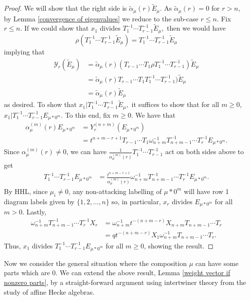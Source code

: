 \documentclass[ALCO,Unicode]{cedram}
\newcommand{\y}{{ \mathscr{Y} }}
\begin{document}
\begin{proof}
We will show that the right side is $\widetilde{\alpha}_{\mu}(r)\widetilde{E}_{\mu}$.
As $\widetilde{\alpha}_{\mu}(r) = 0$ for $r > n$, by Lemma \ref{convergence of eigenvalues} we reduce to the sub-case $r \leq n$. Fix $r \leq n$. 
If we could show that $x_1$ divides $ T_1^{-1}\cdots T_{r-1}^{-1}\widetilde{E}_{\mu},$ then we would have $$\rho(T_1^{-1}\cdots T_{r-1}^{-1}\widetilde{E}_{\mu}) = T_1^{-1}\cdots T_{r-1}^{-1}\widetilde{E}_{\mu} $$
implying that 
\begin{align*}
\y_r(\widetilde{E}_{\mu}) &= \widetilde{\alpha}_{\mu}(r) (T_{r-1}\cdots T_1 \rho T_1^{-1}\cdots T_{r-1}^{-1}) \widetilde{E}_{\mu} \\
&= \widetilde{\alpha}_{\mu}(r) T_{r-1}\cdots T_1 T_1^{-1}\cdots T_{r-1}^{-1}) \widetilde{E}_{\mu} \\
&= \widetilde{\alpha}_{\mu}(r)\widetilde{E}_{\mu}
\end{align*}
as desired.
To show that $x_1 | T_1^{-1}\cdots T_{r-1}^{-1}\widetilde{E}_{\mu},$ it suffices to show that for all $m \geq 0$,
$x_1 | T_1^{-1}\cdots T_{r-1}^{-1} E_{\mu *0^m}$. To this end, fix $m \geq 0$. We have that 
\begin{align*}
\alpha_{\mu}^{(m)}(r)E_{\mu*0^m}&= Y_r^{(n+m)}(E_{\mu*0^m}) \\
&= t^{n+m-r+1}T_{r-1}\cdots T_1 \omega_{n+m}^{-1} T_{n+m-1}^{-1}\cdots T_r^{-1} E_{\mu*0^m}.
\end{align*}
Since $\alpha_{\mu}^{(m)}(r) \neq 0$, we can have $\frac{1}{\alpha_{\mu}^{(m)}(r)} T_1 ^{-1}\cdots T_{r-1}^{-1}$ act on both sides above to get 
\begin{align*}
T_1^{-1}\cdots T_{r-1}^{-1} E_{\mu*0^m} &= \frac{t^{n+m-r+1}}{\alpha_{\mu}^{(m)}(r)}\omega_{n+m}^{-1} T_{n+m-1}^{-1}\cdots T_r^{-1} E_{\mu*0^m}.
\end{align*}
 By HHL, since $\mu_i \neq 0$, any non-attacking labelling of $\mu* 0^m$ will have row 1 diagram labels given by $\{1,2,\ldots,n\}$ so, in particular, $x_r$ divides $E_{\mu*0^m}$ for all $m > 0$. Lastly, 
 \begin{align*}
\omega_{n+m}^{-1} T_{n+m-1}^{-1}\cdots T_r^{-1}X_r &= \omega_{n+m}^{-1} t^{-(n+m-r)}X_{n+m}T_{n+m-1}\cdots T_r \\
&= qt^{-(n+m-r)} X_1 \omega_{n+m}^{-1} T_{n+m-1}\cdots T_r.
 \end{align*}
Thus, $x_1$ divides $T_1^{-1}\cdots T_{r-1}^{-1} E_{\mu*0^m}$ for all $m \geq 0$, showing the result.
\end{proof}

Now we consider the general situation where the composition $\mu$ can have some parts which are 0. We can extend the above result, Lemma \ref{weight vector if nonzero parts}, by a straight-forward argument using intertwiner theory from the study of affine Hecke algebras.
\end{document}
